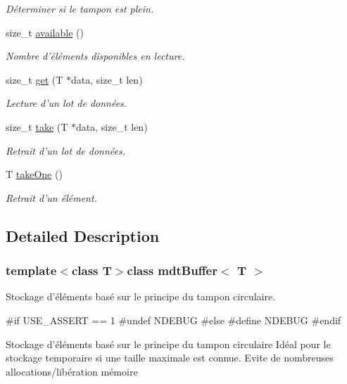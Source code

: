 \begin{DoxyCompactItemize}
\begin{DoxyCompactList}\small\item\em Déterminer si le tampon est plein. \end{DoxyCompactList}\item 
size\-\_\-t \hyperlink{classmdt_buffer_a24ca1a2d00ba1623416ec747ba440adf}{available} ()
\begin{DoxyCompactList}\small\item\em Nombre d'éléments disponibles en lecture. \end{DoxyCompactList}\item 
size\-\_\-t \hyperlink{classmdt_buffer_a123a85c9cd59f80623aba5589709050e}{get} (T $\ast$data, size\-\_\-t len)
\begin{DoxyCompactList}\small\item\em Lecture d'un lot de données. \end{DoxyCompactList}\item 
size\-\_\-t \hyperlink{classmdt_buffer_a58e0f5bce9faea0f7c7195ff5377458c}{take} (T $\ast$data, size\-\_\-t len)
\begin{DoxyCompactList}\small\item\em Retrait d'un lot de données. \end{DoxyCompactList}\item 
T \hyperlink{classmdt_buffer_a690e3f41a62175de48bc73c19f69208d}{take\-One} ()
\begin{DoxyCompactList}\small\item\em Retrait d'un élément. \end{DoxyCompactList}\end{DoxyCompactItemize}


\subsection{Detailed Description}
\subsubsection*{template$<$class T$>$class mdt\-Buffer$<$ T $>$}

Stockage d'éléments basé sur le principe du tampon circulaire. 

\#if U\-S\-E\-\_\-\-A\-S\-S\-E\-R\-T == 1 \#undef N\-D\-E\-B\-U\-G \#else \#define N\-D\-E\-B\-U\-G \#endif

Stockage d'éléments basé sur le principe du tampon circulaire Idéal pour le stockage temporaire si une taille maximale est connue. Evite de nombreuses allocations/libération mémoire 

